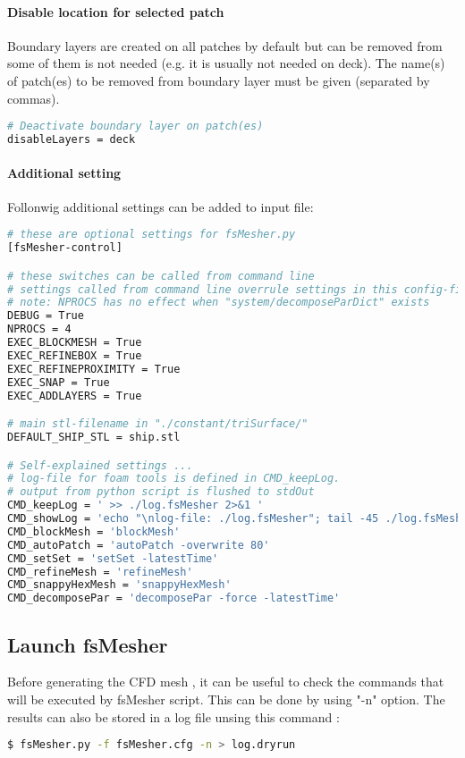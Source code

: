 \paragraph{Disable location for selected patch}
Boundary layers are created on all patches by default but can be removed from some of them is not needed (e.g. it is usually not needed on deck). The name(s) of patch(es) to be removed from boundary layer must be given (separated by commas).
\begin{lstlisting}[language=bash]
# Deactivate boundary layer on patch(es)
disableLayers = deck
\end{lstlisting}

\paragraph{Additional setting}
Follonwig additional settings can be added to input file:

\begin{lstlisting}[language=bash]
# these are optional settings for fsMesher.py
[fsMesher-control]

# these switches can be called from command line
# settings called from command line overrule settings in this config-file
# note: NPROCS has no effect when "system/decomposeParDict" exists
DEBUG = True
NPROCS = 4
EXEC_BLOCKMESH = True
EXEC_REFINEBOX = True
EXEC_REFINEPROXIMITY = True
EXEC_SNAP = True
EXEC_ADDLAYERS = True

# main stl-filename in "./constant/triSurface/"
DEFAULT_SHIP_STL = ship.stl

# Self-explained settings ... 
# log-file for foam tools is defined in CMD_keepLog.
# output from python script is flushed to stdOut
CMD_keepLog = ' >> ./log.fsMesher 2>&1 '
CMD_showLog = 'echo "\nlog-file: ./log.fsMesher"; tail -45 ./log.fsMesher; echo "Please see log-file: ./log.fsMesher"'
CMD_blockMesh = 'blockMesh'
CMD_autoPatch = 'autoPatch -overwrite 80'
CMD_setSet = 'setSet -latestTime'
CMD_refineMesh = 'refineMesh'
CMD_snappyHexMesh = 'snappyHexMesh'
CMD_decomposePar = 'decomposePar -force -latestTime'
\end{lstlisting}

\subsection{Launch fsMesher}

Before generating the CFD mesh , it can be useful to check the commands that will be executed by fsMesher script. This can be done by using "-n" option. The results can also be stored in a log file unsing this command :
\begin{lstlisting}[language=bash]
$ fsMesher.py -f fsMesher.cfg -n > log.dryrun
\end{lstlisting}

